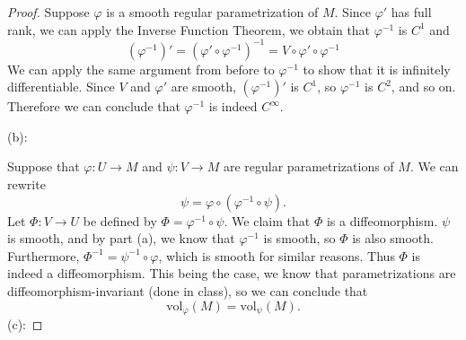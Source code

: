 \documentclass{article}
\newcommand{\vol}{\mathrm{vol}}
\theoremstyle{plain} %
\numberwithin{thm}{section} %
\theoremstyle{definition}
\begin{document}
\begin{proof}
    \medskip

    Suppose \(\varphi\) is a smooth regular parametrization of \(M\). Since \(\varphi'\) has full rank, we can apply the Inverse Function Theorem, we obtain that \(\varphi^{-1}\) is \(C^1\) and
    \[
        (\varphi^{-1})' = (\varphi' \circ \varphi^{-1})^{-1} = V \circ \varphi' \circ \varphi^{-1}
    \]
    We can apply the same argument from before to \(\varphi^{-1}\) to show that it is infinitely differentiable. Since \(V\) and \(\varphi'\) are smooth, \((\varphi^{-1})'\) is \(C^1\), so \(\varphi^{-1}\) is \(C^2\), and so on. Therefore we can conclude that \(\varphi^{-1}\) is indeed \(C^{\infty}\).

    \medskip

    (b):

    Suppose that \(\varphi : U \to M\) and \(\psi : V \to M\) are regular parametrizations of \(M\). We can rewrite
    \[
        \psi = \varphi \circ \left(\varphi^{-1} \circ \psi\right).
    \]
    Let \(\Phi : V \to U\) be defined by \(\Phi = \varphi^{-1} \circ \psi\). We claim that \(\Phi\) is a diffeomorphism. \(\psi\) is smooth, and by part (a), we know that \(\varphi^{-1}\) is smooth, so \(\Phi\) is also smooth. Furthermore, \(\Phi^{-1} = \psi^{-1} \circ \varphi\), which is smooth for similar reasons. Thus \(\Phi\) is indeed a diffeomorphism. This being the case, we know that parametrizations are diffeomorphism-invariant (done in class), so we can conclude that
    \[
        \vol _{\varphi}(M) = \vol _{\psi}(M).
    \]
    \medskip
    (c):


\end{proof}
\end{document}
